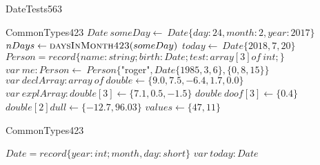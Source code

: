 \documentclass[a4paper,10pt]{article}
\begin{document}
\begin{algorithm}
\caption{DateTests563}
\begin{algorithmic}[5]
\State {}
    \State CommonTypes423
  \EndDecl
  \State \(Date\ someDay\gets\ Date\{day:24,month:2,year:2017\}\)
  \State \(nDays\gets\Call{daysInMonth423}{someDay}\)
  \State \(today\gets\ Date\{2018,7,20\}\)
    \State \(Person = record\{name:string;birth:Date;test:array[3]of\ int;\}\)
  \EndDecl
  \State \(var\ me:Person\gets\ Person\{\)"{}roger"{}\(,Date\{1985,3,6\},\{0,8,15\}\}\)
  \State \(var\ declArray:array\ of\ double\gets\{9.0,7.5,-6.4,1.7,0.0\}\)
  \State \(var\ explArray:double[3]\gets\{7.1,0.5,-1.5\}\)
  \State \(double\ doof[3]\gets\{0.4\}\)
  \State \(double[2]dull\gets\{-12.7,96.03\}\)
  \State \(values\gets\{47,11\}\)
\EndProcedure
\end{algorithmic}
\end{algorithm}


\begin{algorithm}
\caption{CommonTypes423}
\begin{algorithmic}[5]
\State {}
    \State \(Date = record\{year:int;month,day:short\}\)
  \EndDecl
  \State \(var\ today:Date\)
\EndProcedure
\end{algorithmic}
\end{algorithm}
\end{document}
